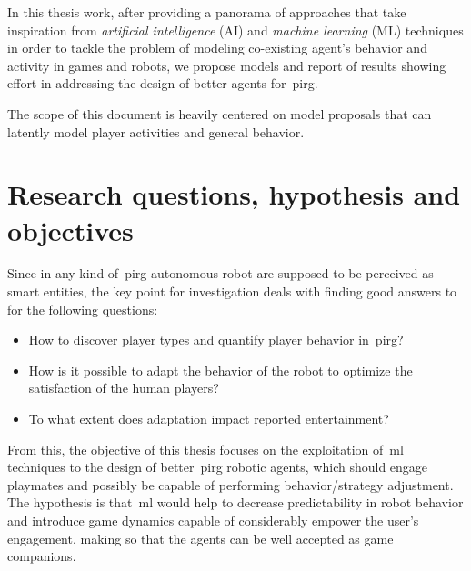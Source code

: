 In this thesis work, after providing a panorama of approaches that take inspiration from \textit{artificial intelligence} (AI) and \textit{machine learning} (ML) techniques in order to tackle the problem of modeling co-existing agent's behavior and activity in games and robots, we propose models and report of results showing effort in addressing the design of better agents for~\gls{pirg}.

The scope of this document is heavily centered on model proposals that can latently model player activities and general behavior. 

\section{Research questions, hypothesis and objectives}\label{sec:research_question}
Since in any kind of~\gls{pirg} autonomous robot are supposed to be perceived as smart entities, the key point for investigation deals with finding good answers to for the following questions:

\begin{itemize}
\item How to discover player types and quantify player behavior in~\gls{pirg}?
\item How is it possible to adapt the behavior of the robot to optimize the satisfaction of the human players?
\item To what extent does adaptation impact reported entertainment?
\end{itemize}

From this, the objective of this thesis focuses on the exploitation of~\gls{ml} techniques to the design of better~\gls{pirg} robotic agents, which should engage playmates and possibly be capable of performing behavior/strategy adjustment. The hypothesis is that~\gls{ml} would help to decrease predictability in robot behavior and introduce game dynamics capable of considerably empower the user’s engagement, making so that the agents can be well accepted as game companions.


